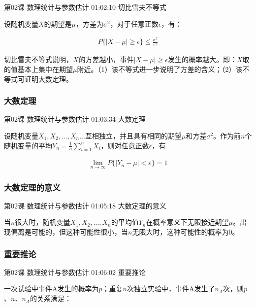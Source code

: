 \documentclass[UTF8]{ctexart}
\begin{document}
第02课 数理统计与参数估计 01:02:10 切比雪夫不等式

设随机变量$X$的期望是$\mu$，方差为$\sigma^{2}$，对于任意正数$\epsilon$，有：

\begin{equation}
\begin{aligned}
P\{ |X-\mu| \geq \epsilon \} \leq \frac{\sigma^{2}}{\epsilon^{2}}
\end{aligned}
\end{equation}

切比雪夫不等式说明，$X$的方差越小，事件$|X-\mu| \geq \epsilon$发生的概率越大。即：$X$取的值基本上集中在期望$\mu$附近。（1）该不等式进一步说明了方差的含义；（2）该不等式可证明大数定理。

\subsubsection{大数定理}

第02课 数理统计与参数估计 01:03:34 大数定理

设随机变量$X_{1},X_{2},\dots,X_{n}\dots$互相独立，并且具有相同的期望$\mu$和方差$\sigma^{2}$。作为前$n$个随机变量的平均$Y_{n}=\frac{1}{n}\sum_{i=1}^{n}X_{i}$，则对任意正数$\epsilon$，有

\begin{equation}
\begin{aligned}
\underset{n \rightarrow \infty}{\lim} P \{ |Y_{n}-\mu| < \varepsilon \} = 1
\end{aligned}
\end{equation}

\subsubsection{大数定理的意义}

第02课 数理统计与参数估计 01:05:18 大数定理的意义

当$n$很大时，随机变量$X_{1},X_{2},\dots,X_{n}$的平均值$Y_{n}$在概率意义下无限接近期望$\mu$。出现偏离是可能的，但这种可能性很小，当$n$无限大时，这种可能性的概率为0。

\subsubsection{重要推论}

第02课 数理统计与参数估计 01:06:02 重要推论

一次试验中事件A发生的概率为$p$；重复$n$次独立实验中，事件A发生了$n_{A}$次，则$p$、$n$、$n_{A}$的关系满足：
\end{document}
